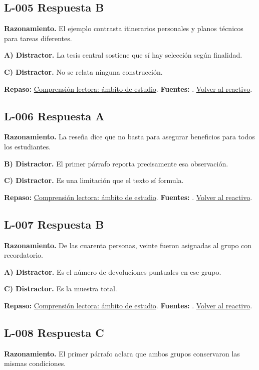 \subsection*{L-005 \quad Respuesta B}\label{s:L-005}
\textbf{Razonamiento.} El ejemplo contrasta itinerarios personales y planos técnicos para tareas diferentes.

\textbf{A) Distractor. }La tesis central sostiene que sí hay selección según finalidad.

\textbf{C) Distractor. }No se relata ninguna construcción.

\textbf{Repaso:} \hyperref[sec:l1]{Comprensión lectora: ámbito de estudio}. \textbf{Fuentes:} \cite{ceneval,reading}. \hyperref[q:L-005]{Volver al reactivo}.\par\medskip

\subsection*{L-006 \quad Respuesta A}\label{s:L-006}
\textbf{Razonamiento.} La reseña dice que no basta para asegurar beneficios para todos los estudiantes.

\textbf{B) Distractor. }El primer párrafo reporta precisamente esa observación.

\textbf{C) Distractor. }Es una limitación que el texto sí formula.

\textbf{Repaso:} \hyperref[sec:l1]{Comprensión lectora: ámbito de estudio}. \textbf{Fuentes:} \cite{ceneval,reading}. \hyperref[q:L-006]{Volver al reactivo}.\par\medskip

\subsection*{L-007 \quad Respuesta B}\label{s:L-007}
\textbf{Razonamiento.} De las cuarenta personas, veinte fueron asignadas al grupo con recordatorio.

\textbf{A) Distractor. }Es el número de devoluciones puntuales en ese grupo.

\textbf{C) Distractor. }Es la muestra total.

\textbf{Repaso:} \hyperref[sec:l1]{Comprensión lectora: ámbito de estudio}. \textbf{Fuentes:} \cite{ceneval,reading}. \hyperref[q:L-007]{Volver al reactivo}.\par\medskip

\subsection*{L-008 \quad Respuesta C}\label{s:L-008}
\textbf{Razonamiento.} El primer párrafo aclara que ambos grupos conservaron las mismas condiciones.

